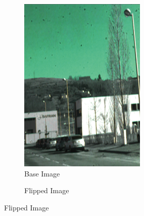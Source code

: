 \begin{figure}[h]
	\centering

	\begin{subfigure}[b]{0.32\linewidth}
		\centering
		\caption*{Base Image}
		
		\includegraphics[width=\linewidth]{Figures/Aug/hsl_flip.png}
	\end{subfigure}
	\begin{subfigure}[b]{0.32\linewidth}  
		\centering 
		\caption*{Flipped Image}
		

\end{subfigure}
\end{figure}

